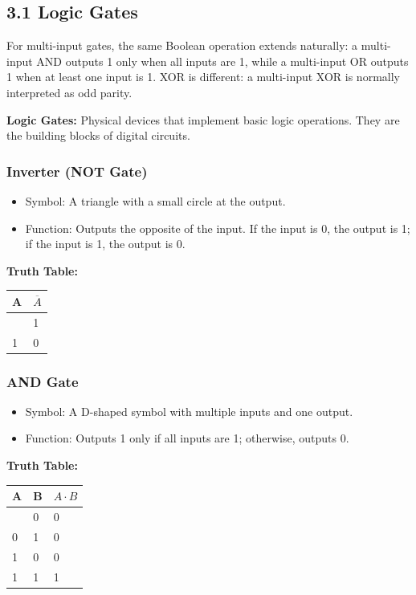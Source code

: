 \documentclass[11pt,a4paper]{article}
\providecommand{\tightlist}{\setlength{\itemsep}{1pt}\setlength{\parskip}{0pt}}
\begin{document}
\subsection{3.1 Logic Gates}\label{logic-gates}

For multi-input gates, the same Boolean operation extends naturally: a
multi-input AND outputs 1 only when all inputs are 1, while a
multi-input OR outputs 1 when at least one input is 1. XOR is different:
a multi-input XOR is normally interpreted as odd parity.

\textbf{Logic Gates:} Physical devices that implement basic logic
operations. They are the building blocks of digital circuits.

\subsubsection{Inverter (NOT Gate)}\label{inverter-not-gate}

\begin{itemize}
\tightlist
\item
  Symbol: A triangle with a small circle at the output.
\item
  Function: Outputs the opposite of the input. If the input is 0, the
  output is 1; if the input is 1, the output is 0.
\end{itemize}

\textbf{Truth Table:}

\begin{longtable}[]{@{}ll@{}}
\toprule\noalign{}
A & \(\overline{A}\) \\
\midrule\noalign{}
\endhead
\bottomrule\noalign{}
\endlastfoot
0 & 1 \\
1 & 0 \\
\end{longtable}

\subsubsection{AND Gate}\label{and-gate}

\begin{itemize}
\tightlist
\item
  Symbol: A D-shaped symbol with multiple inputs and one output.
\item
  Function: Outputs 1 only if all inputs are 1; otherwise, outputs 0.
\end{itemize}

\textbf{Truth Table:}

\begin{longtable}[]{@{}lll@{}}
\toprule\noalign{}
A & B & \(A \cdot B\) \\
\midrule\noalign{}
\endhead
\bottomrule\noalign{}
\endlastfoot
0 & 0 & 0 \\
0 & 1 & 0 \\
1 & 0 & 0 \\
1 & 1 & 1 \\
\end{longtable}
\end{document}
